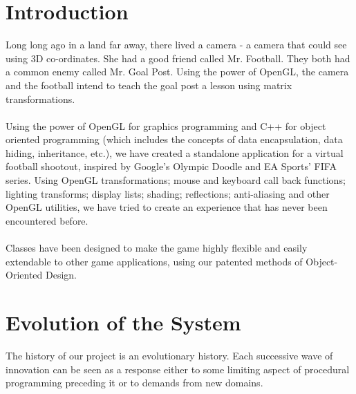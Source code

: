 \documentclass[12pt]{article} %
\begin{document}
\maketitle
\setcounter{secnumdepth}{1}
\section{Introduction}
  Long long ago in a land far away, there lived a camera - a camera that could see using 3D co-ordinates. She had a good friend called Mr. Football. They both had a common enemy called Mr. Goal Post. Using the power of OpenGL, the camera and the football intend to teach the goal post a lesson using matrix transformations. \\
\\Using the power of OpenGL for graphics programming and C++ for object oriented programming (which includes the concepts of data encapsulation, data hiding, inheritance, etc.), we have created a standalone application for a virtual football shootout, inspired by Google’s Olympic Doodle and EA Sports' FIFA series.
Using OpenGL transformations; mouse and keyboard call back functions; lighting transforms; display lists; shading; reflections; anti-aliasing and other OpenGL utilities, we have tried to create an experience that has never been encountered before.\\
\\Classes have been designed to make the game highly flexible and easily extendable to other game applications, using our patented methods of Object-Oriented Design.


\section{Evolution of the System}
The history of our project is an evolutionary
history. Each successive wave of innovation can be seen as a response
either to some limiting aspect of procedural programming preceding it or to
demands from new domains.
\end{document}
